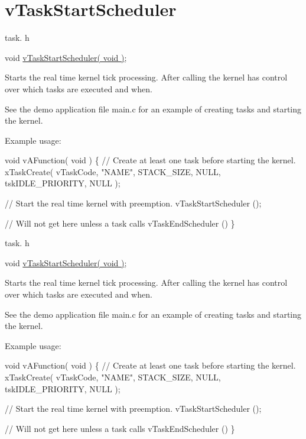 \hypertarget{group__v_task_start_scheduler}{}\section{v\+Task\+Start\+Scheduler}
\label{group__v_task_start_scheduler}
task. h 
\begin{DoxyPre}
void \hyperlink{externals_2freertos_2include_2task_8h_aaf9dca1065c60abdeb309d56ab7293cb}{vTaskStartScheduler( void )};
\end{DoxyPre}


Starts the real time kernel tick processing. After calling the kernel has control over which tasks are executed and when.

See the demo application file main.\+c for an example of creating tasks and starting the kernel.

Example usage\+: 
\begin{DoxyPre}
void vAFunction( void )
\{
  // Create at least one task before starting the kernel.
  xTaskCreate( vTaskCode, "NAME", STACK\_SIZE, NULL, tskIDLE\_PRIORITY, NULL );\end{DoxyPre}



\begin{DoxyPre}  // Start the real time kernel with preemption.
  vTaskStartScheduler ();\end{DoxyPre}



\begin{DoxyPre}  // Will not get here unless a task calls vTaskEndScheduler ()
\}
\end{DoxyPre}


task. h 
\begin{DoxyPre}void \hyperlink{externals_2freertos_2include_2task_8h_aaf9dca1065c60abdeb309d56ab7293cb}{vTaskStartScheduler( void )};\end{DoxyPre}


Starts the real time kernel tick processing. After calling the kernel has control over which tasks are executed and when.

See the demo application file main.\+c for an example of creating tasks and starting the kernel.

Example usage\+: 
\begin{DoxyPre}
void vAFunction( void )
\{
    // Create at least one task before starting the kernel.
    xTaskCreate( vTaskCode, "NAME", STACK\_SIZE, NULL, tskIDLE\_PRIORITY, NULL );\end{DoxyPre}



\begin{DoxyPre}    // Start the real time kernel with preemption.
    vTaskStartScheduler ();\end{DoxyPre}



\begin{DoxyPre}    // Will not get here unless a task calls vTaskEndScheduler ()
\}
  \end{DoxyPre}
 